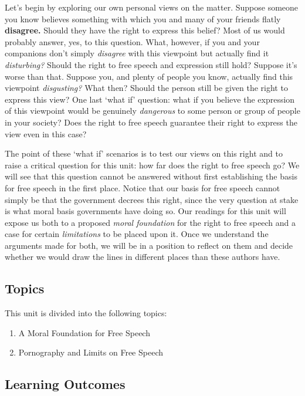 \documentclass[
]{book}
\providecommand{\tightlist}{%
  \setlength{\itemsep}{0pt}\setlength{\parskip}{0pt}}
\begin{document}
Let's begin by exploring our own personal views on the matter. Suppose someone you know believes something with which you and many of your friends flatly \textbf{disagree.} Should they have the right to express this belief? Most of us would probably answer, yes, to this question. What, however, if you and your companions don't simply \emph{disagree} with this viewpoint but actually find it \emph{disturbing?} Should the right to free speech and expression still hold? Suppose it's worse than that. Suppose you, and plenty of people you know, actually find this viewpoint \emph{disgusting?} What then? Should the person still be given the right to express this view? One last `what if' question: what if you believe the expression of this viewpoint would be genuinely \emph{dangerous} to some person or group of people in your society? Does the right to free speech guarantee their right to express the view even in this case?

The point of these `what if' scenarios is to test our views on this right and to raise a critical question for this unit: how far does the right to free speech go? We will see that this question cannot be answered without first establishing the basis for free speech in the first place. Notice that our basis for free speech cannot simply be that the government decrees this right, since the very question at stake is what moral basis governments have doing so. Our readings for this unit will expose us both to a proposed \emph{moral foundation} for the right to free speech and a case for certain \emph{limitations} to be placed upon it. Once we understand the arguments made for both, we will be in a position to reflect on them and decide whether we would draw the lines in different places than these authors have.

\hypertarget{topics-2}{%
\subsection*{Topics}\label{topics-2}}

This unit is divided into the following topics:

\begin{enumerate}
\def\labelenumi{\arabic{enumi}.}
\tightlist
\item
  A Moral Foundation for Free Speech
\item
  Pornography and Limits on Free Speech
\end{enumerate}

\hypertarget{learning-outcomes-2}{%
\subsection*{Learning Outcomes}\label{learning-outcomes-2}}
\end{document}
